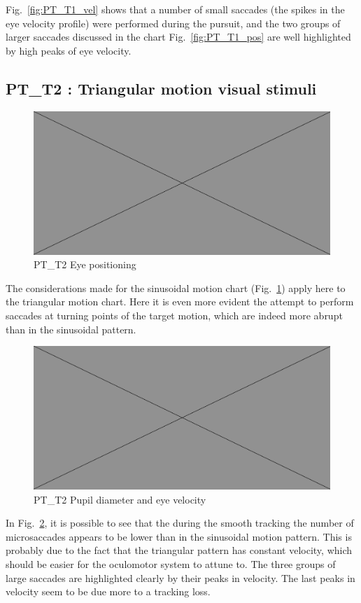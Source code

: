 Fig.~\ref{fig:PT_T1_vel} shows that a number of small saccades (the spikes in the eye velocity profile) were performed during the pursuit, and the two groups of larger saccades discussed in the chart Fig.~\ref{fig:PT_T1_pos} are well highlighted by high peaks of eye velocity.



\subsection{PT\_T2 : Triangular motion visual stimuli}
\label{sec:PT_T2}

\begin{figure}[h]
  \centering
  \includegraphics[width=.5\textwidth]{figures/placeholderImg.jpg}
  \caption[PT\_T2 Eye positioning]{PT\_T2 Eye positioning}
  \label{fig:PT_T2_pos}
\end{figure}

The considerations made for the sinusoidal motion chart (Fig.~\ref{fig:PT_T2_pos}) apply here to the triangular motion chart. Here it is even more evident the attempt to perform saccades at turning points of the target motion, which are indeed more abrupt than in the sinusoidal pattern.

\begin{figure}[h]
  \centering
  \includegraphics[width=.5\textwidth]{figures/placeholderImg.jpg}
  \caption[PT\_T2 Eye pupil velocity]{PT\_T2 Pupil diameter and eye velocity}
  \label{fig:PT_T2_vel}
\end{figure}

In Fig.~\ref{fig:PT_T2_vel}, it is possible to see that the during the smooth tracking the number of microsaccades appears to be lower than in the sinusoidal motion pattern. This is probably due to the fact that the triangular pattern has constant velocity, which should be easier for the oculomotor system to attune to. The three groups of large saccades are highlighted clearly by their peaks in velocity. The last peaks in velocity seem to be due more to a tracking loss.




